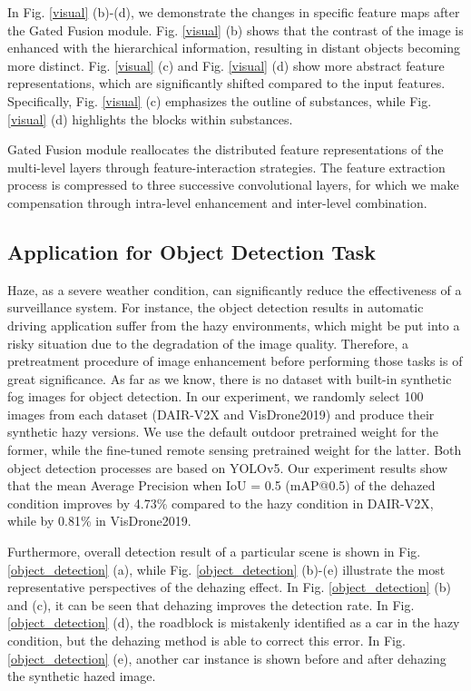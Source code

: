\documentclass[lettersize,journal]{IEEEtran}
\begin{document}
In Fig. \ref{visual} (b)-(d), we demonstrate the changes in specific feature maps after the Gated Fusion module. Fig. \ref{visual} (b) shows that the contrast of the image is enhanced with the hierarchical information, resulting in distant objects becoming more distinct. Fig. \ref{visual} (c) and Fig. \ref{visual} (d) show more abstract feature representations, which are significantly shifted compared to the input features. Specifically, Fig. \ref{visual} (c) emphasizes the outline of substances, while Fig. \ref{visual} (d) highlights the blocks within substances.

Gated Fusion module reallocates the distributed feature representations of the multi-level layers through feature-interaction strategies. The feature extraction process is compressed to three successive convolutional layers, for which we make compensation through intra-level enhancement and inter-level combination.  

\subsection{Application for Object Detection Task}
Haze, as a severe weather condition, can significantly reduce the effectiveness of a surveillance system. For instance, the object detection results in automatic driving application suffer from the hazy environments, which might be put into a risky situation due to the degradation of the image quality. Therefore, a pretreatment procedure of image enhancement before performing those tasks is of great significance. As far as we know, there is no dataset with built-in synthetic fog images for object detection. In our experiment, we randomly select 100 images from each dataset (DAIR-V2X and VisDrone2019) and produce their synthetic hazy versions. We use the default outdoor pretrained weight for the former, while the fine-tuned remote sensing pretrained weight for the latter. Both object detection processes are based on YOLOv5. Our experiment results show that the mean Average Precision when IoU = 0.5 (mAP@0.5) of the dehazed condition improves by 4.73\% compared to the hazy condition in DAIR-V2X, while by 0.81\% in VisDrone2019.

Furthermore, overall detection result of a particular scene is shown in Fig. \ref{object_detection} (a), while Fig. \ref{object_detection} (b)-(e) illustrate the most representative perspectives of the dehazing effect. In Fig. \ref{object_detection} (b) and (c), it can be seen that dehazing improves the detection rate. In Fig. \ref{object_detection} (d), the roadblock is mistakenly identified as a car in the hazy condition, but the dehazing method is able to correct this error. In Fig. \ref{object_detection} (e), another car instance is shown before and after dehazing the synthetic hazed image. 
\end{document}
